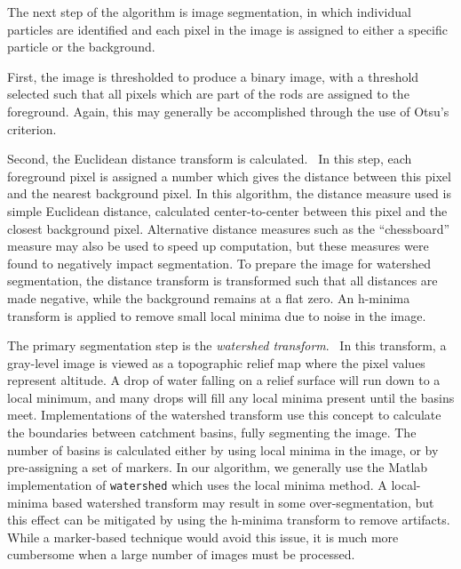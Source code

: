 The next step of the algorithm is image segmentation, in which individual particles are identified and each pixel
in the image is assigned to either a specific particle or the background. 


First, the image is thresholded to produce a binary image, with a threshold selected such that all pixels which
are part of the rods are assigned to the foreground. Again, this may generally be accomplished through the use of 
Otsu's criterion.~\cite{otsu-threshold}

Second, the Euclidean distance transform is 
calculated.~\cite{matlab-bwdist}  In this step, each foreground pixel is assigned a number which
gives the distance between this pixel and the nearest background pixel. In this algorithm, the distance measure used
is simple Euclidean distance, calculated center-to-center between this pixel and the closest background pixel.  Alternative
distance measures such as the ``chessboard'' measure may also be used to speed up computation, but these measures were
found to negatively impact segmentation.  To prepare the image for watershed segmentation, the distance 
transform is transformed such that all distances are made
negative, while the background remains at a flat zero. 
An h-minima transform is applied to remove small local minima
due to noise in the image.~\cite{soille-book}

The primary segmentation step is the \textit{watershed 
transform}.~\cite{matlab-watershed} In this transform, a gray-level image is viewed as
a topographic relief map where the pixel values represent altitude. A drop of water falling on a relief 
surface will run down to a local minimum, and many drops will fill any 
local minima present until the basins meet.
Implementations of the watershed transform use this concept to calculate the boundaries between catchment basins,
fully segmenting the image.  The number of basins is calculated either by using local minima in the image, or by 
pre-assigning a set of markers.  In our algorithm, we generally use the Matlab implementation of \texttt{watershed} which
uses the local minima method.  A local-minima based watershed transform may result in some 
over-segmentation, but this effect can be mitigated by using the h-minima transform to remove 
artifacts.  While a marker-based technique would avoid this issue, it is much more cumbersome when a large number
of images must be processed.

